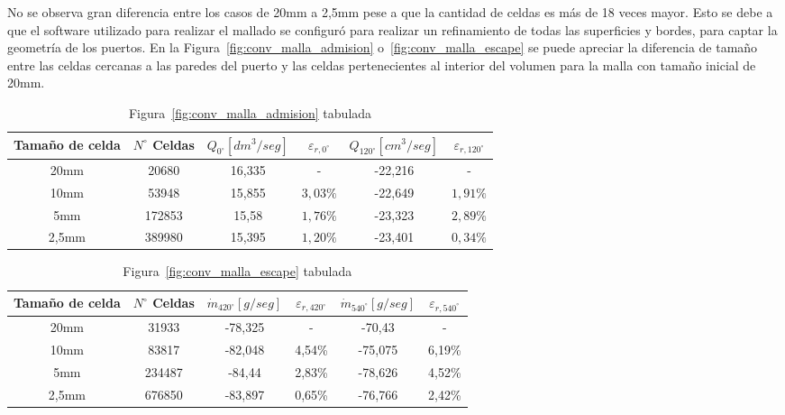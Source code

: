 No se observa gran diferencia entre los casos de 20mm a 2,5mm pese a que la
cantidad de celdas es más de 18 veces mayor.
%
Esto se debe a que el software utilizado para realizar el mallado se configuró
para realizar un refinamiento de todas las superficies y bordes, para captar la
geometría de los puertos.
%
En la Figura~\ref{fig:conv_malla_admision} o~\ref{fig:conv_malla_escape} se
puede apreciar la diferencia de tamaño entre las celdas cercanas a las paredes
del puerto y las celdas pertenecientes al interior del volumen para la malla
con tamaño inicial de 20mm.

\begin{table}[h!]
  \centering
  \begin{tabular}{cccccc}\toprule
    Tamaño de celda & $N^{\circ}$ Celdas & $Q_{0^{\circ}} [dm^{3}/seg]$ & $\varepsilon_{r,0^{\circ}}$ & $Q_{120^{\circ}} [cm^{3}/seg]$ & $\varepsilon_{r,120^{\circ}}$ \\ \midrule
    20mm  & 20680  & 16,335 & -        & -22,216 & - \\
    10mm  & 53948  & 15,855 & $3,03\%$ & -22,649 & $1,91\%$ \\
    5mm   & 172853 & 15,58  & $1,76\%$ & -23,323 & $2,89\%$ \\
    2,5mm & 389980 & 15,395 & $1,20\%$ & -23,401 & $0,34\%$ \\ \bottomrule
  \end{tabular}
  \caption{Figura~\ref{fig:conv_malla_admision} tabulada}\label{tab:convergencia_malla_admision}
\end{table}

\begin{table}[h!]
  \centering
  \begin{tabular}{cccccc}\toprule
    Tamaño de celda & $N^{\circ}$ Celdas & $\dot{m}_{420^{\circ}} [g/seg]$ & $\varepsilon_{r,420^{\circ}}$ & $\dot{m}_{540^{\circ}} [g/seg]$ & $\varepsilon_{r,540^{\circ}}$ \\ \midrule
    20mm  & 31933  & -78,325 & - & -70,43 & - \\
    10mm  & 83817  & -82,048 & 4,54\% & -75,075 & 6,19\% \\
    5mm   & 234487 & -84,44  & 2,83\% & -78,626 & 4,52\% \\
    2,5mm & 676850 & -83,897 & 0,65\% & -76,766 & 2,42\% \\ \bottomrule
  \end{tabular}
  \caption{Figura~\ref{fig:conv_malla_escape} tabulada}\label{tab:convergencia_malla_escape}
\end{table}

